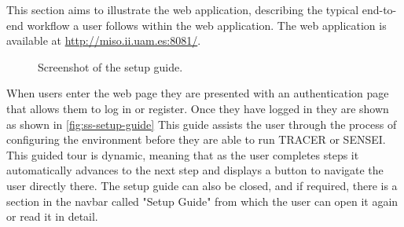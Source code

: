 This section aims to illustrate the web application,
describing the typical end-to-end workflow
a user follows within the web application.
The web application is available at \url{http://miso.ii.uam.es:8081/}.

\begin{figure}[htpb]
  \centering
  \caption{Screenshot of the setup guide.}
  \label{fig:ss-setup-guide}
\end{figure}

When users enter the web page
they are presented with an authentication page
that allows them to log in or register.
Once they have logged in they are shown
as shown in \autoref{fig:ss-setup-guide}
This guide assists the user
through the process of configuring the environment
before they are able to run \ac{TRACER} or SENSEI.
This guided tour is dynamic,
meaning that as the user completes steps
it automatically advances to the next step
and displays a button to navigate the user directly there.
The setup guide can also be closed,
and if required, there is a section in the navbar called "Setup Guide"
from which the user can open it again or read it in detail.

